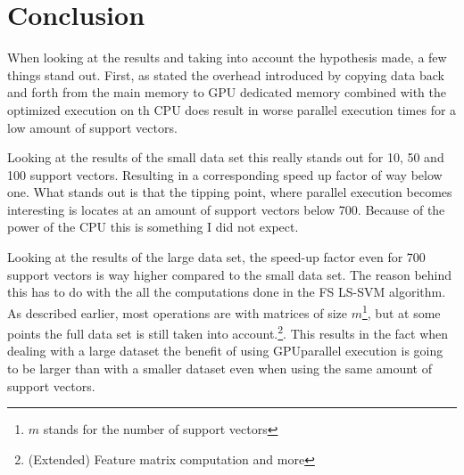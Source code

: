 \section{Conclusion}
When looking at the results and taking into account the hypothesis made, a few things stand out.
First, as stated the overhead introduced by copying data back and forth from the main memory to GPU dedicated memory combined with the optimized execution on th CPU does result in worse parallel execution times for a low amount of support vectors.\par 
Looking at the results of the small data set this really stands out for 10, 50 and 100 support vectors.
Resulting in a corresponding speed up factor of way below one. 
What stands out is that the tipping point, where parallel execution becomes interesting is locates at an amount of support vectors below 700.
Because of the power of the CPU this is something I did not expect.\par 
Looking at the results of the large data set, the speed-up factor even for 700 support vectors is way higher compared to the small data set.
The reason behind this has to do with the all the computations done in the FS LS-SVM algorithm.
As described earlier, most operations are with matrices of size $m$\footnote{$m$ stands for the number of support vectors}, but at some points the full data set is still taken into account.\footnote{(Extended) Feature matrix computation and more}.
This results in the fact when dealing with a large dataset the benefit of using GPUparallel execution is going to be larger than with a smaller dataset even when using the same amount of support vectors.






